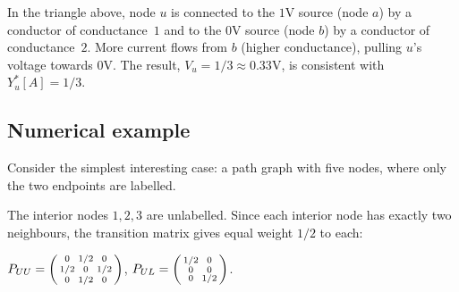 \begin{notechapter}
\begin{intuition}
In the triangle above, node $u$ is connected to the $1$V source (node $a$)
by a conductor of conductance~$1$ and to the $0$V source (node $b$) by a
conductor of conductance~$2$. More current flows from $b$ (higher
conductance), pulling $u$'s voltage towards $0$V. The result,
$V_u = 1/3 \approx 0.33\text{V}$, is consistent with $Y_u^*[A] = 1/3$.
\end{intuition}

\subsection{Numerical example}
\label{semi-supervised-graphs:subsec:lp_example}

\begin{example}
\label{semi-supervised-graphs:ex:lp_path}
Consider the simplest interesting case: a path graph with five nodes, where
only the two endpoints are labelled.

\begin{center}
\end{center}

The interior nodes $1, 2, 3$ are unlabelled. Since each interior node has
exactly two neighbours, the transition matrix gives equal weight $1/2$ to each:

$P_{UU} = \begin{psmallmatrix} 0 & 1/2 & 0 \\ 1/2 & 0 & 1/2 \\
0 & 1/2 & 0 \end{psmallmatrix}$, \;
$P_{UL} = \begin{psmallmatrix} 1/2 & 0 \\ 0 & 0 \\ 0 & 1/2 \end{psmallmatrix}$.


\end{example}
\end{notechapter}
